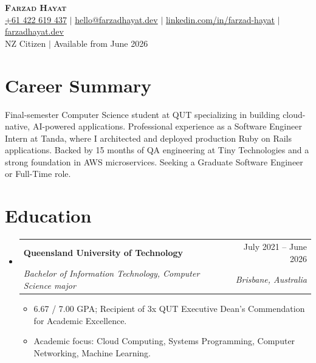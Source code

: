 \documentclass[a4paper,11pt]{article}
\makeatletter
\newcommand{\resumeItem}[1]{
  \item\small{
    {#1 \vspace{-2pt}}
  }
}
\newcommand{\resumeSubheading}[4]{
  \vspace{-2pt}\item
    \begin{tabular*}{0.97\textwidth}[t]{l@{\extracolsep{\fill}}r}
      \textbf{#1} & #2 \\
      \textit{\small#3} & \textit{\small #4} \\
    \end{tabular*}\vspace{-7pt}
}
\newcommand{\resumeSubHeadingListStart}{\begin{itemize}[leftmargin=0.15in, label={}]}
\newcommand{\resumeSubHeadingListEnd}{\end{itemize}}
\newcommand{\resumeItemListStart}{\begin{itemize}}
\newcommand{\resumeItemListEnd}{\end{itemize}\vspace{-5pt}}
\makeatother
\begin{document}

\begin{center}
    \textbf{\Huge \scshape Farzad Hayat} \\ \vspace{1pt}
    \small \href{tel:+61422619437}{+61 422 619 437} $|$ \href{mailto:hello@farzadhayat.dev}{hello@farzadhayat.dev} $|$ 
    \href{https://linkedin.com/in/farzad-hayat}{linkedin.com/in/farzad-hayat} $|$
    \href{https://farzadhayat.dev}{farzadhayat.dev} \\
    \vspace{1pt}
    \small NZ Citizen $|$ Available from June 2026
\end{center}


\section{Career Summary}
\begin{itemize}[leftmargin=0.15in, label={}]
  \small{\item{
    Final-semester Computer Science student at QUT specializing in building cloud-native, AI-powered applications. Professional experience as a Software Engineer Intern at Tanda, where I architected and deployed production Ruby on Rails applications. Backed by 15 months of QA engineering at Tiny Technologies and a strong foundation in AWS microservices. Seeking a Graduate Software Engineer or Full-Time role.
  }}
\end{itemize}


\section{Education}
  \resumeSubHeadingListStart
    \resumeSubheading
      {Queensland University of Technology}{July 2021 -- June 2026}
      {Bachelor of Information Technology, Computer Science major}{Brisbane, Australia}
      \resumeItemListStart
        \resumeItem{6.67 / 7.00 GPA; Recipient of 3x QUT Executive Dean’s Commendation for Academic Excellence.}
        \resumeItem{Academic focus: Cloud Computing, Systems Programming, Computer Networking, Machine Learning.}
      \resumeItemListEnd
  \resumeSubHeadingListEnd
\end{document}
